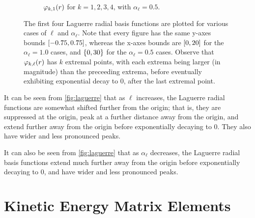 \documentclass[]{article}
\begin{document}
\begin{figure}[h]
\begin{subfigure}[b]{0.45\linewidth}
    \caption
    {
      $\varphi_{k, 1}(r)$ for $k = 1, 2, 3, 4$, with $\alpha_{\ell} = 0.5$.
    }
    \label{fig:laguerre-1-0.5}
  \end{subfigure}

  \caption{
    The first four Laguerre radial basis functions are plotted for various cases
    of $\ell$ and $\alpha_{\ell}$.
    Note that every figure has the same y-axes bounds $[-0.75, 0.75]$,
    whereas the x-axes bounds are $[0, 20]$ for the $\alpha_{\ell} = 1.0$ cases,
    and $\lbrace0, 30\rbrace$ for the $\alpha_{\ell} = 0.5$ cases.
    Observe that $\varphi_{k, \ell}(r)$ has $k$ extremal points, with
    each extrema being larger (in magnitude) than the preceeding extrema, before
    eventually exhibiting exponential decay to 0, after the last extremal point.
  }
  \label{fig:laguerre}
\end{figure}

It can be seen from \autoref{fig:laguerre} that as $\ell$ increases, the
Laguerre radial functions are somewhat shifted further from the origin;
that is, they are suppressed at the origin, peak at a further distance away from
the origin, and extend further away from the origin before exponentially
decaying to 0.
They also have wider and less pronounced peaks.

It can also be seen from \autoref{fig:laguerre} that as $\alpha_{\ell}$
decreases, the Laguerre radial basis functions extend much further away from the
origin before exponentially decaying to 0, and have wider and less pronounced
peaks.

\clearpage
\section{Kinetic Energy Matrix Elements}
\label{sec:kinet-energy-matr}
\end{document}
